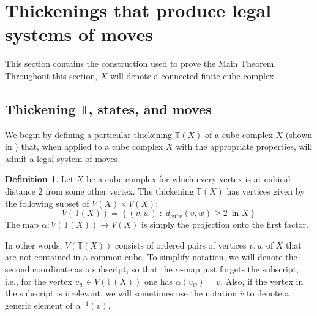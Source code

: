 \documentclass[12pt, letterpaper]{article}
\renewcommand{\a}{\alpha}
\theoremstyle{plain}
\theoremstyle{definition}
\newtheorem{defn}[thm]{Definition}
\begin{document}
\section{Thickenings that produce legal systems of moves}\label{sec:thickening}

This section contains the construction used to prove the Main Theorem. Throughout this section, $X$ will denote a connected finite cube complex.

\subsection[3.1]{Thickening $\mathbb{T}$, states, and moves}\label{sec:BarryTime}

We begin by defining a particular thickening $\mathbb{T}(X)$ of a cube complex $X$ (shown in ) that, when applied to a cube complex $X$ with the appropriate properties, will admit a legal system of moves. 

\begin{defn}\label{def:state}
    Let $X$ be a cube complex for which every vertex is at cubical distance $2$ from some other vertex. The thickening $\mathbb{T}(X)$ has vertices given by the following subset of $V(X) \times V(X)$:
    \[ V(\mathbb{T}(X)) =\left\{(v,w) \; : \; d_{\text{cube}}(v,w) \geq 2 \, \text{ in } X \right\} \]
    The map $\alpha \colon V(\mathbb{T}(X)) \rightarrow V(X)$ is simply the projection onto the first factor.
\end{defn}

In other words, $V(\mathbb{T}(X))$ consists of ordered pairs of vertices $v, w$ of $X$ that are not contained in a common cube. To simplify notation, we will denote the second coordinate as a subscript, so that the $\alpha$-map just forgets the subscript, i.e., for the vertex $v_w\in V(\mathbb{T}(X))$ one has $\alpha(v_w)=v$. Also, if the vertex in the subscript is irrelevant, we will sometimes use the notation $\overline{v}$ to denote a generic element of  $\a^{-1}(v)$.
\end{document}
